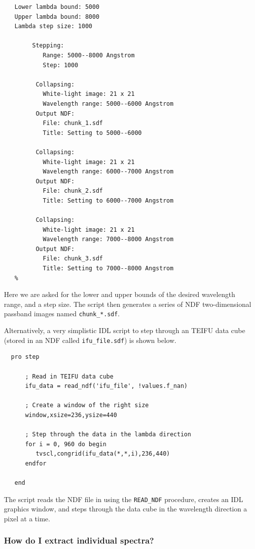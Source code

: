 \documentclass[twoside,11pt]{article}
\newcommand{\xref}[3]{#1}
\begin{document}
\begin{\htmlonly}
{\begin{verbatim}
   Lower lambda bound: 5000
   Upper lambda bound: 8000
   Lambda step size: 1000

        Stepping:
           Range: 5000--8000 Angstrom
           Step: 1000

         Collapsing:
           White-light image: 21 x 21
           Wavelength range: 5000--6000 Angstrom
         Output NDF:
           File: chunk_1.sdf
           Title: Setting to 5000--6000

         Collapsing:
           White-light image: 21 x 21
           Wavelength range: 6000--7000 Angstrom
         Output NDF:
           File: chunk_2.sdf
           Title: Setting to 6000--7000 Angstrom

         Collapsing:
           White-light image: 21 x 21
           Wavelength range: 7000--8000 Angstrom
         Output NDF:
           File: chunk_3.sdf
           Title: Setting to 7000--8000 Angstrom
   %
\end{verbatim}\normalsize

Here we are asked for the lower and upper bounds of the desired
wavelength range, and a step size.  The script then generates a series
of \xref{NDF}{sun33}{} two-dimensional passband images named \verb+chunk_*.sdf+. 

Alternatively, a very simplistic IDL script to step through an TEIFU
data cube (stored in an NDF called {\tt ifu\_file.sdf}) is shown below.

\small\begin{verbatim}
  pro step
      
      ; Read in TEIFU data cube
      ifu_data = read_ndf('ifu_file', !values.f_nan)
      
      ; Create a window of the right size
      window,xsize=236,ysize=440
      
      ; Step through the data in the lambda direction
      for i = 0, 960 do begin
         tvscl,congrid(ifu_data(*,*,i),236,440)
      endfor 
      
   end
\end{verbatim}\normalsize

The script reads the NDF file in using the {\tt READ\_NDF} procedure,
creates an IDL graphics window, and steps through the data cube in the
wavelength direction a pixel at a time.

\subsubsection{How do I extract individual spectra?}

}
\end{\htmlonly}
\end{document}
